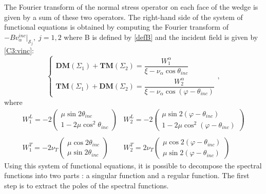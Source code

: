 The Fourier transform of the normal stress operator on each face of the wedge is given by a sum of these two operators. The right-hand side of the system of functional equations is obtained by computing the Fourier transform of $-Bv_{\alpha}^{inc}|_{\mathcal{S}_j},\; j=1,2$ where B is defined by \eqref{defB} and the incident field is given by \eqref{C3:vinc}:
\begin{equation}
\left\{
\begin{matrix}
\textbf{DM}(\Sigma_1)+\textbf{TM}(\Sigma_2)=\dfrac{W_1^{\alpha}}{\xi-\nu_{\alpha} \cos \theta_{inc}} \\
\textbf{TM}(\Sigma_1)+\textbf{DM}(\Sigma_2)=\dfrac{W_2^{\alpha}}{\xi-\nu_{\alpha}\cos(\varphi-\theta_{inc})}
\end{matrix}
\right.,
\label{equationsintegrales}
\end{equation}
where
\begin{equation}
\begin{matrix}
W_1^L=-2\begin{pmatrix}
\mu \sin 2\theta_{inc}\\
1-2\mu\cos^2\theta_{inc}
\end{pmatrix}&
W_2^L=-2\begin{pmatrix}
\mu \sin 2(\varphi-\theta_{inc}) \\
1-2\mu\cos^2(\varphi-\theta_{inc})
\end{pmatrix} \\
~
\\
W_1^T=-2 \nu_T \begin{pmatrix}
\mu \cos 2\theta_{inc}\\
\mu \sin 2\theta_{inc}
\end{pmatrix}&
W_2^T=2\nu_T \begin{pmatrix}
\mu \cos 2(\varphi-\theta_{inc})\\
\mu \sin 2(\varphi-\theta_{inc})
\end{pmatrix}
\end{matrix}
\end{equation}
Using this system of functional equations, it is possible to decompose the spectral functions into two parts : a singular function and a regular function. The first step is to extract the poles of the spectral functions.
